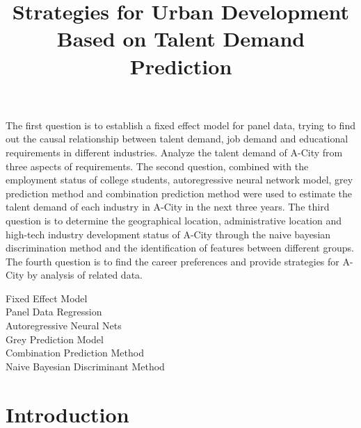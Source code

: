 \documentclass{mcmthesis}
\title{Strategies for Urban Development Based on Talent Demand Prediction }
\begin{document}
\begin{sheetsummary}

\par\noindent
 The first question is to establish a fixed effect model for panel data, trying to find out the causal relationship between talent demand, job demand and educational requirements in different industries. Analyze the talent demand of A-City from three aspects of requirements. The second question, combined with the employment status of college students, autoregressive neural network model, grey prediction method and combination prediction method were used to estimate the talent demand of each industry in A-City in the next three years. The third question is to determine the geographical location, administrative location and high-tech industry development status of A-City through the naive bayesian discrimination method and the identification of features between different groups. The fourth question is to find the career preferences and provide strategies for A-City by analysis of related data.
\end{sheetsummary}


\begin{abstract}


\end{abstract}

\begin{keywords}
Fixed Effect Model \\
Panel Data Regression  \\
Autoregressive Neural Nets \\
 Grey Prediction Model  \\
Combination Prediction Method  \\
Naive Bayesian Discriminant Method
\end{keywords}



\maketitle
 \tableofcontents
 \newpage


\section{Introduction}
\end{document}
